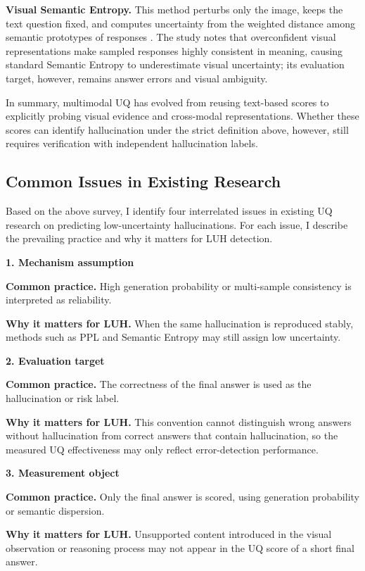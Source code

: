 \textbf{Visual Semantic Entropy.} This method perturbs only the image, keeps the text question fixed, and computes uncertainty from the weighted distance among semantic prototypes of responses \citep{huy2026visualsemanticentropy}. The study notes that overconfident visual representations make sampled responses highly consistent in meaning, causing standard Semantic Entropy to underestimate visual uncertainty; its evaluation target, however, remains answer errors and visual ambiguity.

In summary, multimodal UQ has evolved from reusing text-based scores to explicitly probing visual evidence and cross-modal representations. Whether these scores can identify hallucination under the strict definition above, however, still requires verification with independent hallucination labels.

\subsection{Common Issues in Existing Research}
\label{subsec:gaps}

Based on the above survey, I identify four interrelated issues in existing UQ research on predicting low-uncertainty hallucinations. For each issue, I describe the prevailing practice and why it matters for LUH detection.

\begin{gapblock}
\textbf{1. Mechanism assumption}\par\smallskip
\textbf{Common practice.} High generation probability or multi-sample consistency is interpreted as reliability.\par
\textbf{Why it matters for LUH.} When the same hallucination is reproduced stably, methods such as PPL and Semantic Entropy may still assign low uncertainty.
\end{gapblock}

\begin{gapblock}
\textbf{2. Evaluation target}\par\smallskip
\textbf{Common practice.} The correctness of the final answer is used as the hallucination or risk label.\par
\textbf{Why it matters for LUH.} This convention cannot distinguish wrong answers without hallucination from correct answers that contain hallucination, so the measured UQ effectiveness may only reflect error-detection performance.
\end{gapblock}

\begin{gapblock}
\textbf{3. Measurement object}\par\smallskip
\textbf{Common practice.} Only the final answer is scored, using generation probability or semantic dispersion.\par
\textbf{Why it matters for LUH.} Unsupported content introduced in the visual observation or reasoning process may not appear in the UQ score of a short final answer.
\end{gapblock}

